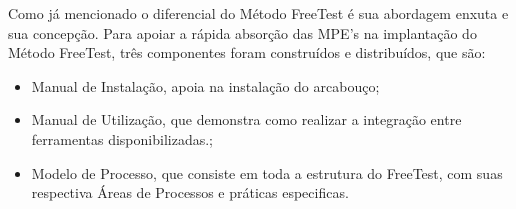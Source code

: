 \begin{table}[H]
\centering
\caption{Estrutura do Método FreeTest \cite{Camilo-junior2012}.}
\label{tab:3.4}
\end{table}

Como já mencionado o diferencial do Método FreeTest é sua abordagem enxuta e sua concepção. Para apoiar a rápida absorção das MPE's na implantação do Método FreeTest, três componentes foram construídos e distribuídos, que são:

\begin{itemize}
    \item Manual de Instalação, apoia na instalação do arcabouço;
    \item Manual de Utilização, que demonstra como realizar a integração entre ferramentas disponibilizadas.;
    \item Modelo de Processo, que consiste em toda a estrutura do FreeTest, com suas respectiva Áreas de Processos e práticas especificas.
\end{itemize}

